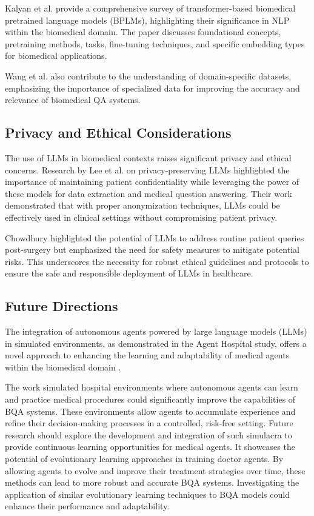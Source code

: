 \documentclass[onecolumn, conference]{IEEEtran}
\begin{document}
Kalyan et al. \cite{Kalyan2021} provide a comprehensive survey of transformer-based biomedical pretrained language models (BPLMs), highlighting their significance in NLP within the biomedical domain. The paper discusses foundational concepts, pretraining methods, tasks, fine-tuning techniques, and specific embedding types for biomedical applications.

Wang et al. \cite{Wang2022} also contribute to the understanding of domain-specific datasets, emphasizing the importance of specialized data for improving the accuracy and relevance of biomedical QA systems.

\subsection{Privacy and Ethical Considerations}
The use of LLMs in biomedical contexts raises significant privacy and ethical concerns. Research by Lee et al. \cite{Lee2023} on privacy-preserving LLMs highlighted the importance of maintaining patient confidentiality while leveraging the power of these models for data extraction and medical question answering. Their work demonstrated that with proper anonymization techniques, LLMs could be effectively used in clinical settings without compromising patient privacy.

Chowdhury \cite{Chowdhury2023} highlighted the potential of LLMs to address routine patient queries post-surgery but emphasized the need for safety measures to mitigate potential risks. This underscores the necessity for robust ethical guidelines and protocols to ensure the safe and responsible deployment of LLMs in healthcare.

\subsection{Future Directions}

The integration of autonomous agents powered by large language models (LLMs) in simulated environments, as demonstrated in the Agent Hospital study, offers a novel approach to enhancing the learning and adaptability of medical agents within the biomedical domain \cite{Li2024}.

The work simulated hospital environments where autonomous agents can learn and practice medical procedures could significantly improve the capabilities of BQA systems. These environments allow agents to accumulate experience and refine their decision-making processes in a controlled, risk-free setting. Future research should explore the development and integration of such simulacra to provide continuous learning opportunities for medical agents. It showcases the potential of evolutionary learning approaches in training doctor agents. By allowing agents to evolve and improve their treatment strategies over time, these methods can lead to more robust and accurate BQA systems. Investigating the application of similar evolutionary learning techniques to BQA models could enhance their performance and adaptability.
\end{document}
